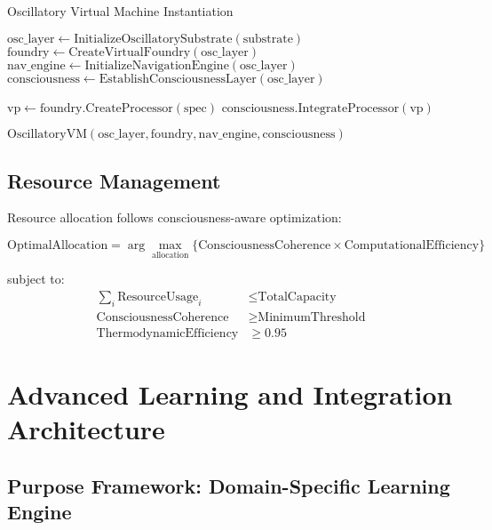 \documentclass[12pt,a4paper]{article}
\begin{document}
\begin{algorithm}
\caption{Oscillatory Virtual Machine Instantiation}
\begin{algorithmic}[1]
    \State $\text{osc\_layer} \leftarrow \text{InitializeOscillatorySubstrate}(\text{substrate})$
    \State $\text{foundry} \leftarrow \text{CreateVirtualFoundry}(\text{osc\_layer})$
    \State $\text{nav\_engine} \leftarrow \text{InitializeNavigationEngine}(\text{osc\_layer})$
    \State $\text{consciousness} \leftarrow \text{EstablishConsciousnessLayer}(\text{osc\_layer})$
    
        \State $\text{vp} \leftarrow \text{foundry.CreateProcessor}(\text{spec})$
        \State $\text{consciousness.IntegrateProcessor}(\text{vp})$
    \EndFor
    
    \State \Return $\text{OscillatoryVM}(\text{osc\_layer}, \text{foundry}, \text{nav\_engine}, \text{consciousness})$
\EndProcedure
\end{algorithmic}
\end{algorithm}

\subsection{Resource Management}

Resource allocation follows consciousness-aware optimization:

\begin{equation}
\text{OptimalAllocation} = \arg\max_{\text{allocation}} \{\text{ConsciousnessCoherence} \times \text{ComputationalEfficiency}\}
\end{equation}

subject to:
\begin{align}
\sum_i \text{ResourceUsage}_i &\leq \text{TotalCapacity} \\
\text{ConsciousnessCoherence} &\geq \text{MinimumThreshold} \\
\text{ThermodynamicEfficiency} &\geq 0.95
\end{align}

\section{Advanced Learning and Integration Architecture}

\subsection{Purpose Framework: Domain-Specific Learning Engine}
\end{document}
